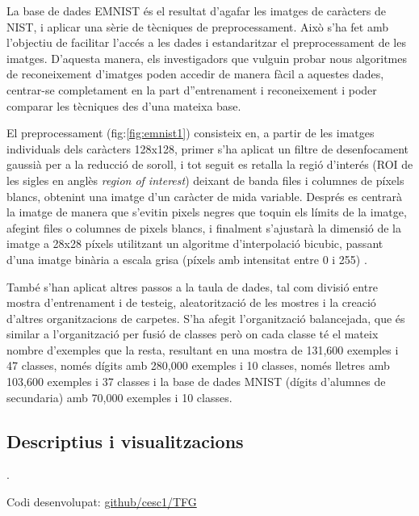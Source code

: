 \documentclass[12pt, spanish]{article}
\newcounter{lastnote}
\newenvironment{scilastnote}{%
\setcounter{lastnote}{\value{enumiv}}%
\addtocounter{lastnote}{+1}%
\begin{list}%
{\arabic{lastnote}.}
{\setlength{\leftmargin}{.22in}}
{\setlength{\labelsep}{.5em}}}
{\end{list}}
\begin{document}
La base de dades EMNIST és el resultat d'agafar les imatges de caràcters de NIST, i aplicar una sèrie de tècniques de preprocessament. Això s'ha fet amb l'objectiu de facilitar l'accés a les dades i estandaritzar el preprocessament de les imatges. D'aquesta manera, els investigadors que vulguin probar nous algoritmes de reconeixement d'imatges poden accedir de manera fàcil a aquestes dades, centrar-se completament en la part d''entrenament i reconeixement i poder comparar les tècniques des d'una mateixa base. 

El preprocessament (fig:\ref{fig:emnist1}) consisteix en, a partir de les imatges individuals dels caràcters 128x128, primer s'ha aplicat un filtre de desenfocament gaussià per a la reducció de soroll, i tot seguit es retalla la regió d'interés (ROI de les sigles en anglès \textit{region of interest}) deixant de banda files i columnes de píxels blancs, obtenint una imatge d'un caràcter de mida variable. Després es centrarà la imatge de manera que s'evitin pixels negres que toquin els límits de la imatge, afegint files o columnes de pixels blancs, i finalment s'ajustarà la dimensió de la imatge a 28x28 píxels utilitzant un algoritme d'interpolació bicubic, passant d'una imatge binària a escala grisa (píxels amb intensitat entre 0 i 255)  \cite{EMNIST}.

També s'han aplicat altres passos a la taula de dades, tal com divisió entre mostra d'entrenament i de testeig, aleatorització de les mostres i la creació d'altres organitzacions de carpetes. S'ha afegit l'organització balancejada, que és similar a l'organització per fusió de classes però on cada classe té el mateix nombre d'exemples que la resta, resultant en una mostra de 131,600 exemples i 47 classes, només dígits amb 280,000 exemples i 10 classes, només lletres amb 103,600 exemples i 37 classes i la base de dades MNIST (dígits d'alumnes de secundaria) amb 70,000 exemples i 10 classes. 


\subsection{Descriptius i visualitzacions}








\clearpage






\begin{scilastnote}
\item Codi desenvolupat: \href{https://github.com/cesc1/TFG}{github/cesc1/TFG}

\end{scilastnote}
\end{document}
